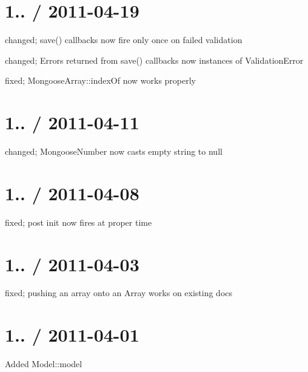 \section*{1.. / 2011-\/04-\/19 }


\begin{DoxyItemize}
\item changed; save() callbacks now fire only once on failed validation
\item changed; Errors returned from save() callbacks now instances of Validation\+Error
\item fixed; Mongoose\+Array\+::index\+Of now works properly
\end{DoxyItemize}

\section*{1.. / 2011-\/04-\/11 }


\begin{DoxyItemize}
\item changed; Mongoose\+Number now casts empty string to null
\end{DoxyItemize}

\section*{1.. / 2011-\/04-\/08 }


\begin{DoxyItemize}
\item fixed; post init now fires at proper time
\end{DoxyItemize}

\section*{1.. / 2011-\/04-\/03 }


\begin{DoxyItemize}
\item fixed; pushing an array onto an Array works on existing docs
\end{DoxyItemize}

\section*{1.. / 2011-\/04-\/01 }


\begin{DoxyItemize}
\item Added Model\+::model
\end{DoxyItemize}

